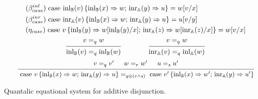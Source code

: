 \documentclass[a4paper,UKenglish,cleveref, autoref, thm-restate]{lipics-v2021}
\begin{document}
  \begin{figure}[h!]
    \begin{equation*}
            \hspace{30pt}
        \begin{split}
          &(\beta_{case}^{inl}) \hspace{3pt} \text{case } 
          \mathrm{inl}_{\mathbb{B}}(v)\, \{ \mathrm{inl}_{\mathbb{B}} (x) \Rightarrow w  
          ;\, \mathrm{inr}_{\mathbb{A}} (y) 
          \Rightarrow u\}= w[v/x]
          \\
          &(\beta_{case}^{inr}) \hspace{3pt} \text{case } 
          \mathrm{inr}_{\mathbb{A}}(v)\, \{ \mathrm{inl}_{\mathbb{B}} (x) \Rightarrow w 
          ;\, \mathrm{inr}_{\mathbb{A}} (y) 
          \Rightarrow u\}= u[v/y]
          \\
          & (\eta_{case}) \hspace{3pt} \text{case } v\, \{\text{inl}_{\mathbb{B}} (y) \Rightarrow w [ \text{inl}_{\mathbb{B}}(y)/x] ;\, \text{inr}_{\mathbb{A}} (z) \Rightarrow w [ \text{inr}_{\mathbb{A}}(z)/x]\} = w[v/x] 
        \end{split}
    \end{equation*}
    \noindent\dotfill{}
    \begin{equation*}
            \hspace{75pt}
            \begin{prooftree}
                    \hypo{ v =_q w}
                    \infer1[]{\inl_\typeB(v) =_q \inl_\typeB(w)}
            \end{prooftree}
            \hspace{40pt}
            \begin{prooftree}
                    \hypo{ v =_q w}
                    \infer1[]{\inr_\typeA(v) =_q \inl_\typeA(w)}
            \end{prooftree}
    \end{equation*}
    \begin{equation*}
    \hspace{20pt}
   \begin{prooftree}
      \hypo{ v =_{q} v' }
      \hypo{w=_{r} w'}
      \hypo{u=_{s}u'}
      \infer3[]{\text{ case } v \,   \{\inl_\typeB (x) \Rightarrow w ; \, \inr_\typeA (y) 
              \Rightarrow u\} 
      =_{q\otimes(r \wedge s)} 
      \text{ case } v' 
      \,  \{\inl_\typeB (x) \Rightarrow w' ; \,\inr_\typeA (y) \Rightarrow u'\} }
  \end{prooftree}
    \end{equation*}
    \caption{Quantalic equational system for additive disjunction.}
    \label{fig:equations-in-context-cond}
    \end{figure}
\end{document}
